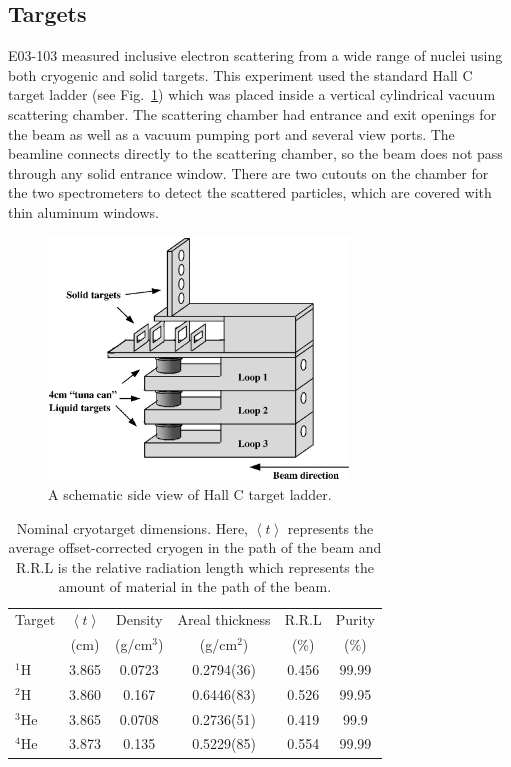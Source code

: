 \subsection{Targets}\label{target.ssec}

E03-103 measured inclusive electron scattering from a wide range of nuclei
using both cryogenic and solid targets. This experiment used the
standard Hall C target ladder (see Fig.~\ref{tarladder_fig}) which was placed
inside a vertical cylindrical vacuum scattering chamber. The scattering
chamber had entrance and exit openings for the beam as well as a vacuum
pumping port and several view ports. The beamline connects directly to the
scattering chamber, so the beam does not pass through any solid entrance
window. There are two cutouts on the chamber for the two spectrometers to
detect the scattered particles, which are covered with thin aluminum windows.

\begin{figure}[htb]
\begin{center}
\includegraphics[width=80mm, angle=0]{plots/target_ladder.eps}
\caption{A schematic side view of Hall C target ladder.}
\label{tarladder_fig}
\end{center}
\end{figure}

\begin{table}[htb]
\begin{center}
\caption{Nominal cryotarget dimensions. Here, $\left<t\right>$ represents the
average offset-corrected cryogen in the path of the beam and R.R.L is the
relative radiation length which represents the amount of material in the path
of the
beam.\label{cryotarthick_tab}}
\begin{tabular}{|l|c|c|c|c|c|}
\hline
Target & $\left<t\right>$ & Density & Areal thickness &R.R.L & Purity\\ 
& (cm) & (g/cm$^3$) & (g/cm$^2$) &($\%$) &($\%$)\\
\hline
$^1$H  & 3.865 & 0.0723 & 0.2794(36) & 0.456 &99.99\\
$^2$H  & 3.860 & 0.167  & 0.6446(83) & 0.526 &99.95\\
$^3$He & 3.865 & 0.0708 & 0.2736(51) & 0.419 &99.9\\
$^4$He & 3.873 & 0.135  & 0.5229(85) & 0.554 &99.99\\
\hline
\end{tabular}
\end{center}
\end{table}

